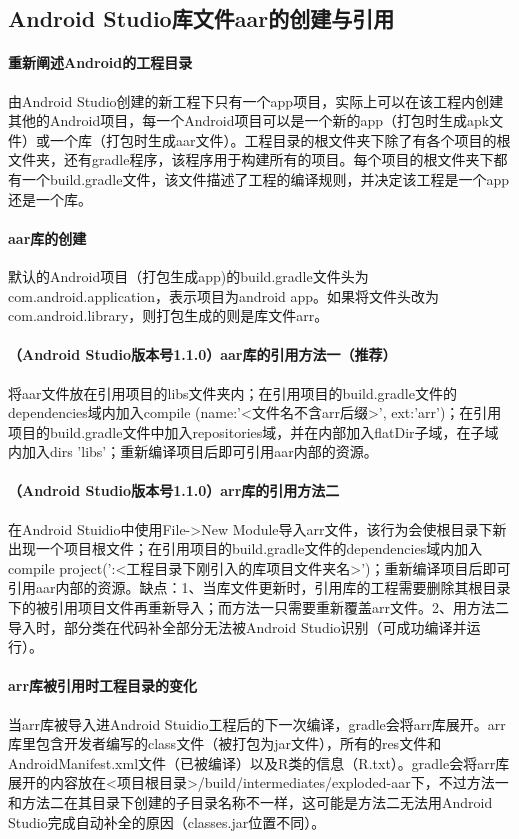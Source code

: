 \documentclass[UTF8]{ctexart}
\begin{document}
    \subsection{Android Studio库文件aar的创建与引用}
    \paragraph{重新阐述Android的工程目录}
    由Android Studio创建的新工程下只有一个app项目，实际上可以在该工程内创建其他的Android项目，每一个Android项目可以是一个新的app（打包时生成apk文件）或一个库（打包时生成aar文件）。工程目录的根文件夹下除了有各个项目的根文件夹，还有gradle程序，该程序用于构建所有的项目。每个项目的根文件夹下都有一个build.gradle文件，该文件描述了工程的编译规则，并决定该工程是一个app还是一个库。
    \paragraph{aar库的创建}
    默认的Android项目（打包生成app)的build.gradle文件头为com.android.application，表示项目为android app。如果将文件头改为com.android.library，则打包生成的则是库文件arr。
    \paragraph{（Android Studio版本号1.1.0）aar库的引用方法一（推荐）}
    将aar文件放在引用项目的libs文件夹内；在引用项目的build.gradle文件的dependencies域内加入compile (name:'<文件名不含arr后缀>', ext:'arr')；在引用项目的build.gradle文件中加入repositories域，并在内部加入flatDir子域，在子域内加入dirs 'libs'；重新编译项目后即可引用aar内部的资源。
    \paragraph{（Android Studio版本号1.1.0）arr库的引用方法二}
    在Android Stuidio中使用File->New Module导入arr文件，该行为会使根目录下新出现一个项目根文件；在引用项目的build.gradle文件的dependencies域内加入compile project(':<工程目录下刚引入的库项目文件夹名>')；重新编译项目后即可引用aar内部的资源。缺点：1、当库文件更新时，引用库的工程需要删除其根目录下的被引用项目文件再重新导入；而方法一只需要重新覆盖arr文件。2、用方法二导入时，部分类在代码补全部分无法被Android Studio识别（可成功编译并运行）。
    \paragraph{arr库被引用时工程目录的变化}
    当arr库被导入进Android Stuidio工程后的下一次编译，gradle会将arr库展开。arr库里包含开发者编写的class文件（被打包为jar文件），所有的res文件和AndroidManifest.xml文件（已被编译）以及R类的信息（R.txt）。gradle会将arr库展开的内容放在<项目根目录>/build/intermediates/exploded-aar下，不过方法一和方法二在其目录下创建的子目录名称不一样，这可能是方法二无法用Android Studio完成自动补全的原因（classes.jar位置不同）。
\end{document}
